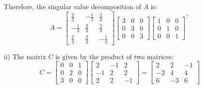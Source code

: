 \begin{homeworkProblem}
\begin{solution}
\begin{itemize}
                Therefore, the singular value decomposition of $A$ is:
                \[
                    A = \begin{bmatrix}
                        \frac{2}{3} & -\frac{1}{3} & \frac{2}{3} \\
                        -\frac{1}{3} & \frac{2}{3} & \frac{2}{3} \\
                        \frac{2}{3} & \frac{2}{3} & -\frac{1}{3}
                    \end{bmatrix}
                    \begin{bmatrix}
                        3 & 0 & 0 \\
                        0 & 3 & 0 \\
                        0 & 0 & 3
                    \end{bmatrix}
                    \begin{bmatrix}
                        1 & 0 & 0 \\
                        0 & 1 & 0 \\
                        0 & 0 & 1
                    \end{bmatrix}^\top
                \]

            \item[ii)] The matrix $C$ is given by the product of two
                matrices: 
                \[
                    C = \begin{bmatrix}
                        0 & 0 & 1 \\
                        0 & 2 & 0 \\
                        3 & 0 & 0
                    \end{bmatrix}
                    \begin{bmatrix}
                        2 & -1 & 2 \\
                        -1 & 2 & 2 \\
                        2 & 2 & -1
                    \end{bmatrix}
                    = \begin{bmatrix}
                        2 & 2 & -1 \\
                        -2 & 4 & 4 \\
                        6 & -3 & 6
                    \end{bmatrix}
                \]


\end{itemize}
\end{solution}
\end{homeworkProblem}
